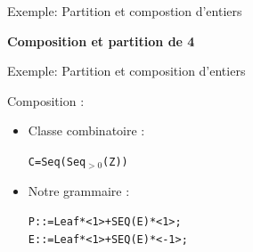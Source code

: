 \documentclass{beamer}
\begin{document}
\begin{frame}{Exemple: Partition et compostion d'entiers}
\begin{center}
\textbf{Composition et partition de 4} \\
\vspace{0.5cm}
\end{center}
\end{frame}


\begin{frame}{Exemple: Partition et composition d'entiers}

\begin{block}{Composition :}
\begin{itemize}
\item Classe combinatoire :\\
\begin{alltt}
\hspace{10 mm} C = Seq(Seq$_{>0}$(Z)) \\
\end{alltt}
\item Notre grammaire : \\
\begin{alltt}
\hspace{10 mm} P ::= Leaf * <1> + SEQ(E) * <1>; \\
\hspace{10 mm} E ::= Leaf * <1> + SEQ(E) * <-1>; \\
\end{alltt}
\end{itemize} 
\end{block}

\end{frame}
\end{document}
